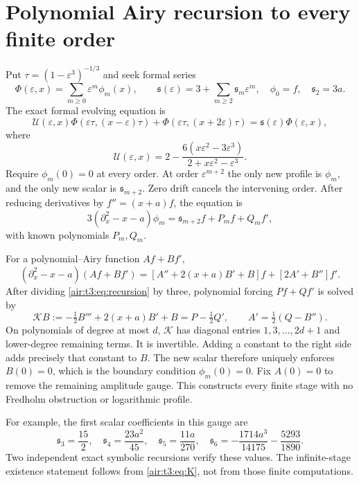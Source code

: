 \documentclass[11pt,letterpaper]{article}
\numberwithin{equation}{section}
\theoremstyle{remark}
\newcommand{\eps}{\varepsilon}
\begin{document}
\section{Polynomial Airy recursion to every finite order}
Put $\tau=(1-\eps^3)^{-1/3}$ and seek formal series
\[
\Phi(\eps,x)=\sum_{m\ge0}\eps^m\phi_m(x),\qquad
\mathfrak s(\eps)=3+\sum_{m\ge2}\mathfrak s_m\eps^m,
\quad \phi_0=f,\quad \mathfrak s_2=3a.
\]
The exact formal evolving equation is
\begin{equation}\label{air:t3:eq:formal}
\mathcal U(\eps,x)\Phi(\eps\tau,(x-\eps)\tau)
+\Phi(\eps\tau,(x+2\eps)\tau)
=\mathfrak s(\eps)\Phi(\eps,x),
\end{equation}
where
\[
\mathcal U(\eps,x)=2-\frac{6(x\eps^2-3\eps^3)}{2+x\eps^2-\eps^3}.
\]
Require $\phi_m(0)=0$ at every order. At order $\eps^{m+2}$ the only new profile is $\phi_m$, and the only new scalar is $\mathfrak s_{m+2}$. Zero drift cancels the intervening order. After reducing derivatives by $f''=(x+a)f$, the equation is
\begin{equation}\label{air:t3:eq:recursion}
3(\partial_x^2-x-a)\phi_m
=\mathfrak s_{m+2}f+P_m f+Q_m f',
\end{equation}
with known polynomials $P_m,Q_m$.

For a polynomial--Airy function $Af+Bf'$,
\[
(\partial_x^2-x-a)(Af+Bf')
=[A''+2(x+a)B'+B]f+[2A'+B'']f'.
\]
After dividing \eqref{air:t3:eq:recursion} by three, polynomial forcing $Pf+Qf'$ is solved by
\begin{equation}\label{air:t3:eq:K}
\mathcal K B:=-\tfrac12B'''+2(x+a)B'+B=P-\tfrac12Q',
\qquad A'=\tfrac12(Q-B'').
\end{equation}
On polynomials of degree at most $d$, $\mathcal K$ has diagonal entries $1,3,\ldots,2d+1$ and lower-degree remaining terms. It is invertible. Adding a constant to the right side adds precisely that constant to $B$. The new scalar therefore uniquely enforces $B(0)=0$, which is the boundary condition $\phi_m(0)=0$. Fix $A(0)=0$ to remove the remaining amplitude gauge. This constructs every finite stage with no Fredholm obstruction or logarithmic profile.

For example, the first scalar coefficients in this gauge are
\[
\mathfrak s_3=\frac{15}{2},\quad
\mathfrak s_4=\frac{23a^2}{45},\quad
\mathfrak s_5=\frac{11a}{270},\quad
\mathfrak s_6=-\frac{1714a^3}{14175}-\frac{5293}{1890}.
\]
Two independent exact symbolic recursions verify these values. The infinite-stage existence statement follows from \eqref{air:t3:eq:K}, not from those finite computations.
\end{document}
